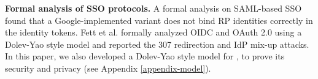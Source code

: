 \noindent\textbf{Formal analysis of SSO protocols.}
A formal analysis on SAML-based SSO \cite{ArmandoCCCT08} found that a Google-implemented variant does not bind RP identities correctly in the identity tokens.
Fett et al. \cite{FettKS16, FettKS17} formally analyzed OIDC and OAuth 2.0 using a Dolev-Yao style model \cite{FettKS14} and reported the 307 redirection and IdP mix-up attacks.
In this paper, we also developed a Dolev-Yao style model for \usso, to prove its security and privacy (see Appendix \ref{appendix-model}).










